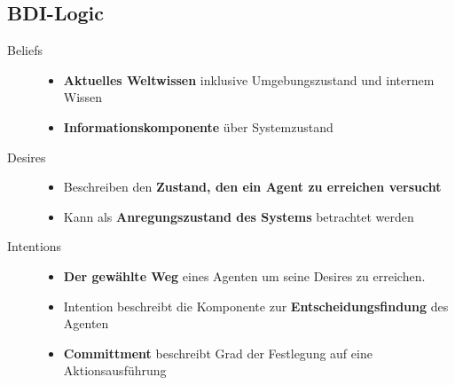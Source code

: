 \documentclass{article} %
\begin{document}
	\subsection{BDI-Logic}
	\begin{description}
		\item [Beliefs]
			\begin{itemize}
				\item \textbf{Aktuelles Weltwissen} inklusive Umgebungszustand und internem Wissen
				\item \textbf{Informationskomponente} über Systemzustand
			\end{itemize}
		\item[Desires] 
			\begin{itemize}
				\item Beschreiben den \textbf{Zustand, den ein Agent zu erreichen versucht}
				\item Kann als \textbf{Anregungszustand des Systems} betrachtet werden
			\end{itemize}
		\item[Intentions]
			\begin{itemize}
				\item \textbf{Der gewählte Weg} eines Agenten um seine Desires zu erreichen.
				\item Intention beschreibt die Komponente zur \textbf{Entscheidungsfindung} des Agenten
				\item \textbf{Committment} beschreibt Grad der Festlegung auf eine Aktionsausführung
			\end{itemize}
	\end{description}
	
\end{document}
